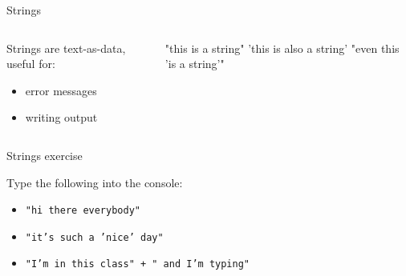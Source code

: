 \documentclass{beamer}
\begin{document}
\begin{frame}[fragile]{Strings}
 \begin{columns}[T]
   \begin{column}{0.4\columnwidth}
     \begin{block}{}
       Strings are text-as-data, useful for:
       \begin{itemize}
         \item<1,2> error messages
         \item<1,3> writing output
       \end{itemize}
     \end{block}
   \end{column}
   \begin{column}{0.5\columnwidth}
     \begin{block}{}
       \begin{semiverbatim}
 "this is a string"
 'this is also a string'
 "even this 'is a string'"
       \end{semiverbatim}
     \end{block}
   \end{column}
 \end{columns}
\end{frame}

\begin{frame}[fragile]{Strings exercise}
  \begin{block}{}
    Type the following into the console:
    \begin{itemize}
      \item \texttt{"hi there everybody"}
      \item \texttt{"it's such a 'nice' day"}
      \item \texttt{"I'm in this class" + " and I'm typing"}
    \end{itemize}
  \end{block}
\end{frame}
\end{document}
